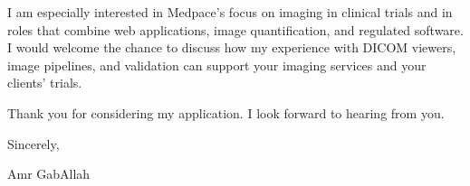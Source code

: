 \documentclass[11pt,a4paper]{article}
\begin{document}
I am especially interested in Medpace's focus on imaging in clinical trials and in roles that combine web applications, image quantification, and regulated software. I would welcome the chance to discuss how my experience with DICOM viewers, image pipelines, and validation can support your imaging services and your clients' trials.

Thank you for considering my application. I look forward to hearing from you.

\vspace{1em}
Sincerely,

\vspace{0.5em}
Amr GabAllah
\end{document}

